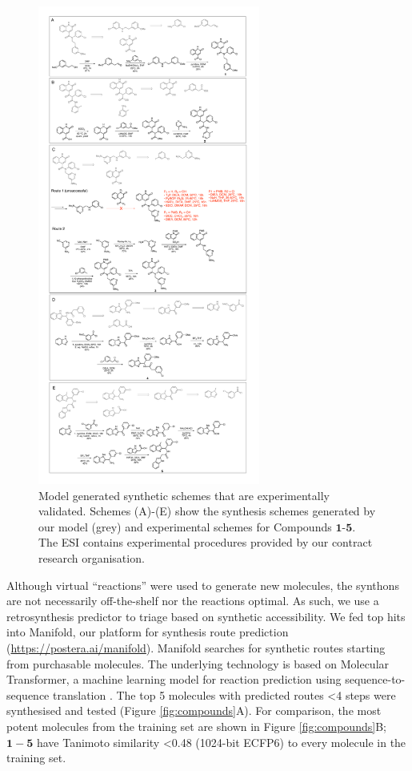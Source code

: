     
\begin{figure}
\centering
    \includegraphics[width=0.65\textwidth]{Chapters/Ranking/Figs/aaron_schemes.pdf}
    \caption{Model generated synthetic schemes that are experimentally validated. Schemes (A)-(E) show the synthesis schemes generated by our model (grey) and experimental schemes for Compounds $\mathbf{1}$-$\mathbf{5}$. The ESI contains experimental procedures provided by our contract research organisation.}
    \label{fig:synthesis_schemes}
\end{figure}

Although virtual ``reactions'' were used to generate new molecules, the synthons are not necessarily off-the-shelf nor the reactions optimal. As such, we use a retrosynthesis predictor to triage based on synthetic accessibility. We fed top hits into Manifold, our platform for synthesis route prediction (\url{https://postera.ai/manifold}). Manifold searches for synthetic routes starting from purchasable molecules. The underlying technology is based on Molecular Transformer, a machine learning model for reaction prediction using sequence-to-sequence translation \citep{yang2019molecular,schwaller2019molecular}. The top 5 molecules with predicted routes <4 steps were synthesised and tested (Figure \ref{fig:compounds}A). For comparison, the most potent molecules from the training set are shown in Figure \ref{fig:compounds}B; $\mathbf{1}-\mathbf{5}$ have Tanimoto similarity <0.48 (1024-bit ECFP6) to every molecule in the training set. 

